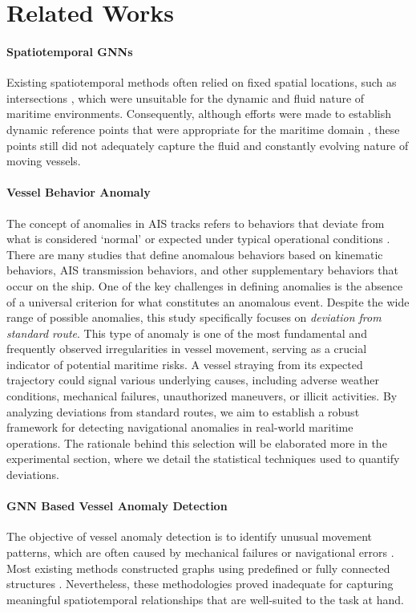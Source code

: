 \section{Related Works}
\paragraph{Spatiotemporal GNNs}
Existing spatiotemporal methods often relied on fixed spatial locations, such as intersections \cite{wang2020traffic, yu2017spatio}, which were unsuitable for the dynamic and fluid nature of maritime environments. Consequently, although efforts were made to establish dynamic reference points that were appropriate for the maritime domain \cite{eljabu2021anomaly, liang2022fine}, these points still did not adequately capture the fluid and constantly evolving nature of moving vessels.

\paragraph{Vessel Behavior Anomaly}
The concept of anomalies in AIS tracks refers to behaviors that deviate from what is considered ‘normal’ or expected under typical operational conditions \cite{laxhammar2008anomaly}. There are many studies \cite{lane2010maritime, davenport2008kinematic, liu2024ais} that define anomalous behaviors based on kinematic behaviors,  AIS transmission behaviors, and other supplementary behaviors that occur on the ship. One of the key challenges in defining anomalies is the absence of a universal criterion for what constitutes an anomalous event. Despite the wide range of possible anomalies, this study specifically focuses on \textit{deviation from standard route}. This type of anomaly is one of the most fundamental and frequently observed irregularities in vessel movement, serving as a crucial indicator of potential maritime risks. A vessel straying from its expected trajectory could signal various underlying causes, including adverse weather conditions, mechanical failures, unauthorized maneuvers, or illicit activities. By analyzing deviations from standard routes, we aim to establish a robust framework for detecting navigational anomalies in real-world maritime operations. The rationale behind this selection will be elaborated more in the experimental section, where we detail the statistical techniques used to quantify deviations.

\paragraph{GNN Based Vessel Anomaly Detection}
The objective of vessel anomaly detection is to identify unusual movement patterns, which are often caused by mechanical failures or navigational errors \cite{ribeiro2023ais}. Most existing methods constructed graphs using predefined or fully connected structures \cite{jiang2024stmgf, liu2023model, wolsing2022anomaly, zhang2023vessel}. Nevertheless, these methodologies proved inadequate for capturing meaningful spatiotemporal relationships that are well-suited to the task at hand.